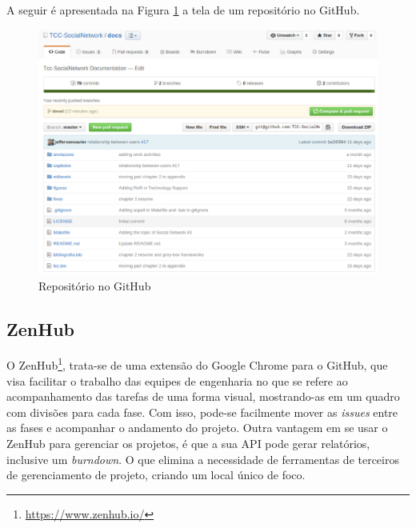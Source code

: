 A seguir é apresentada na Figura \ref{github} a tela de um repositório no GitHub.

\begin{figure}[!h]
	\centering
	\includegraphics[scale=0.35]{figuras/capitulo3/github.eps}
	\caption{Repositório no GitHub}
	\label{github}
\end{figure}

\subsection{ZenHub}

O ZenHub\footnote{\url{https://www.zenhub.io/}}, trata-se de uma extensão do Google Chrome para o GitHub, que visa facilitar o trabalho das equipes de engenharia no que se refere ao acompanhamento das tarefas de uma forma visual, mostrando-as em um quadro com divisões para cada fase. Com isso, pode-se facilmente mover as \textit{issues} entre as fases e acompanhar o andamento do projeto. Outra vantagem em se usar o ZenHub para gerenciar os projetos, é que a sua API pode gerar relatórios, inclusive um \textit{burndown}. O que elimina a necessidade de ferramentas de terceiros de gerenciamento de projeto, criando um local único de foco.

